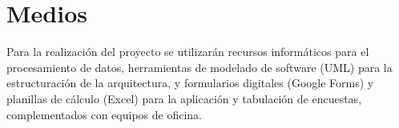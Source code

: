\section{Medios}

Para la realización del proyecto se utilizarán recursos informáticos para el procesamiento de datos, herramientas de modelado de software (UML) para la estructuración de la arquitectura, y formularios digitales (Google Forms) y planillas de cálculo (Excel) para la aplicación y tabulación de encuestas, complementados con equipos de oficina.